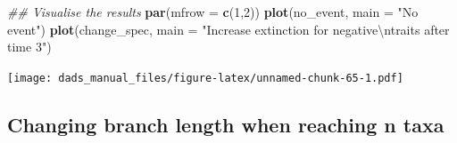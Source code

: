 \documentclass[]{book}
\newenvironment{Shaded}{\begin{snugshade}}{\end{snugshade}}
\newcommand{\CharTok}[1]{\textcolor[rgb]{0.31,0.60,0.02}{#1}}
\newcommand{\CommentTok}[1]{\textcolor[rgb]{0.56,0.35,0.01}{\textit{#1}}}
\newcommand{\DataTypeTok}[1]{\textcolor[rgb]{0.13,0.29,0.53}{#1}}
\newcommand{\DecValTok}[1]{\textcolor[rgb]{0.00,0.00,0.81}{#1}}
\newcommand{\KeywordTok}[1]{\textcolor[rgb]{0.13,0.29,0.53}{\textbf{#1}}}
\newcommand{\NormalTok}[1]{#1}
\newcommand{\StringTok}[1]{\textcolor[rgb]{0.31,0.60,0.02}{#1}}
\begin{document}
\begin{Shaded}
\begin{Highlighting}[]
\CommentTok{## Visualise the results}
\KeywordTok{par}\NormalTok{(}\DataTypeTok{mfrow =} \KeywordTok{c}\NormalTok{(}\DecValTok{1}\NormalTok{,}\DecValTok{2}\NormalTok{))}
\KeywordTok{plot}\NormalTok{(no_event, }\DataTypeTok{main =} \StringTok{"No event"}\NormalTok{)}
\KeywordTok{plot}\NormalTok{(change_spec, }\DataTypeTok{main =} \StringTok{"Increase extinction for negative}\CharTok{\textbackslash{}n}\StringTok{traits after time 3"}\NormalTok{)}
\end{Highlighting}
\end{Shaded}

\texttt{[image: dads\_manual\_files/figure-latex/unnamed-chunk-65-1.pdf]}

\hypertarget{changing-branch-length-when-reaching-n-taxa}{%
\subsection{Changing branch length when reaching n taxa}\label{changing-branch-length-when-reaching-n-taxa}}
\end{document}
